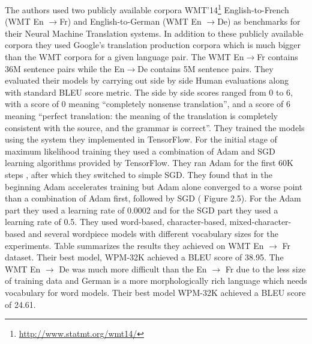 The authors used two publicly available corpora WMT’14\footnote{\url{http://www.statmt.org/wmt14/}} English-to-French (WMT En $\rightarrow$Fr) and English-to-German (WMT En $\rightarrow$De) as benchmarks for their Neural Machine Translation systems. In addition to these publicly available corpora they used Google’s translation production corpora which is much bigger than the WMT corpora for a given language pair. The WMT En$\rightarrow$Fr contains 36M sentence pairs while the En$\rightarrow$De contains 5M sentence pairs. They evaluated their models by carrying out side by side Human evaluations along with standard BLEU score metric. The side by side scores ranged from 0 to 6, with a score of 0 meaning “completely nonsense translation”, and a score of 6 meaning “perfect translation: the meaning of the translation is completely consistent with the source, and the grammar is correct”. They trained the models using the system they implemented in TensorFlow. For the initial stage of maximum likelihood training they used a combination of Adam \citep{DBLP:journals/corr/KingmaB14} and SGD learning algorithms provided by TensorFlow. They ran Adam for the first 60K steps , after which they switched to simple SGD. They found that in the beginning Adam accelerates training but Adam alone converged to a worse point than a combination of Adam first, followed by SGD ( Figure 2.5). For the Adam part they used a learning rate of 0.0002 and for the SGD part they used a learning rate of 0.5. They used word-based, character-based, mixed-character-based and several wordpiece models with different vocabulary sizes for the experiments. Table summarizes the results they achieved on WMT En $\rightarrow$ Fr dataset. Their best model, WPM-32K achieved a BLEU score of 38.95. The WMT En $\rightarrow$ De was much more difficult than the En $\rightarrow$ Fr due to the less size of training data and German is a more morphologically rich language which needs vocabulary for word models. Their best model WPM-32K achieved a BLEU score of 24.61. 

